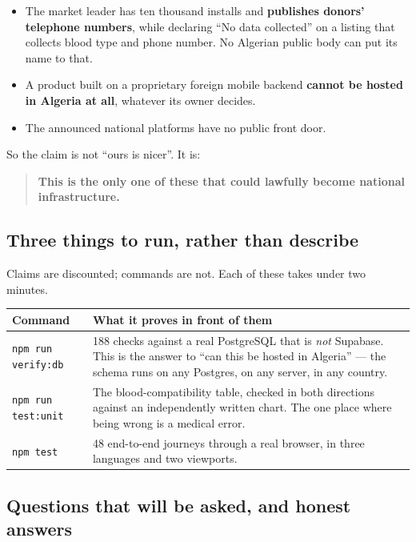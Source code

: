 \documentclass[11pt,a4paper]{article}
\begin{document}
\begin{itemize}[leftmargin=1.4em]
  \item The market leader has ten thousand installs and \textbf{publishes
        donors' telephone numbers}, while declaring ``No data collected'' on a
        listing that collects blood type and phone number. No Algerian public
        body can put its name to that.
  \item A product built on a proprietary foreign mobile backend \textbf{cannot
        be hosted in Algeria at all}, whatever its owner decides.
  \item The announced national platforms have no public front door.
\end{itemize}

So the claim is not ``ours is nicer''. It is:

\begin{quote}
\textbf{This is the only one of these that could lawfully become national
infrastructure.}
\end{quote}

\subsection{Three things to run, rather than describe}

Claims are discounted; commands are not. Each of these takes under two minutes.

\begin{center}
\begin{tabularx}{\textwidth}{@{}lX@{}}
\toprule
\textbf{Command} & \textbf{What it proves in front of them} \\
\midrule
\texttt{npm run verify:db} & 188 checks against a real PostgreSQL that is
\emph{not} Supabase. This is the answer to ``can this be hosted in Algeria'' —
the schema runs on any Postgres, on any server, in any country. \\
\texttt{npm run test:unit} & The blood-compatibility table, checked in both
directions against an independently written chart. The one place where being
wrong is a medical error. \\
\texttt{npm test} & 48 end-to-end journeys through a real browser, in three
languages and two viewports. \\
\bottomrule
\end{tabularx}
\end{center}

\subsection{Questions that will be asked, and honest answers}
\end{document}
